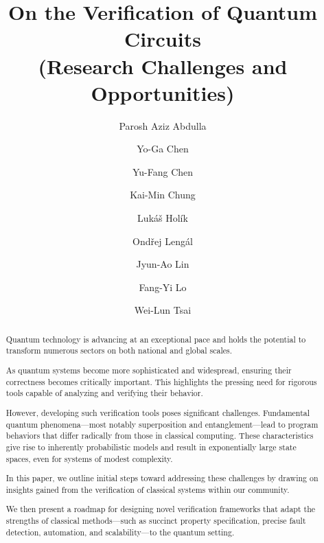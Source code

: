 

\title{On the Verification of Quantum Circuits\\
(Research Challenges and Opportunities) }

\author{
Parosh Aziz Abdulla
\and
Yo-Ga Chen
\and
Yu-Fang Chen
\and
Kai-Min Chung
\and
Luk\'a\v{s} Hol\'ik
\and
Ond\v{r}ej Leng\'{a}l 
\and 
Jyun-Ao Lin
\and
Fang-Yi Lo
\and
Wei-Lun Tsai
}

\maketitle
\begin{abstract}
Quantum technology is advancing at an exceptional pace and holds the potential to transform numerous sectors on both national and global scales. 
 
As quantum systems become more sophisticated and widespread, ensuring their correctness becomes critically important. This highlights the pressing need for rigorous tools capable of analyzing and verifying their behavior.
 
However, developing such verification tools poses significant challenges. Fundamental quantum phenomena—most notably superposition and entanglement—lead to program behaviors that differ radically from those in classical computing. These characteristics give rise to inherently probabilistic models and result in exponentially large state spaces, even for systems of modest complexity.
 

In this paper, we outline initial steps toward addressing these challenges by drawing on insights gained from the verification of classical systems within our community.
 
We then present a roadmap for designing novel verification frameworks that adapt the strengths of classical methods—such as succinct property specification, precise fault detection, automation, and scalability—to the quantum setting.
 
\end{abstract}
